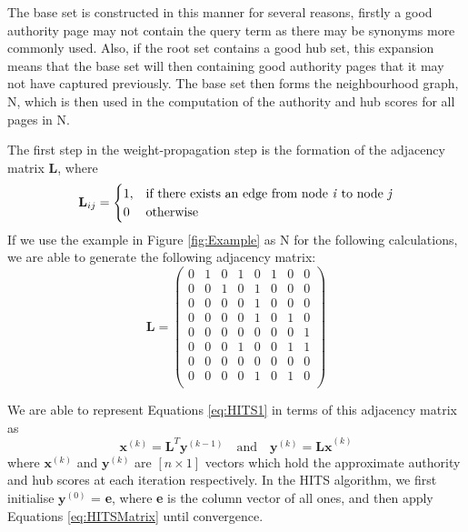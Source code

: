 \documentclass[11pt]{report}
\begin{document}
The base set is constructed in this manner for several reasons, firstly a good authority page may not contain the query term  as there may be synonyms more commonly used. Also, if the root set contains a good hub set, this expansion means that the base set will then containing good authority pages that it may not have captured previously. The base set then forms the neighbourhood graph, N, which is then used in the computation of the authority and hub scores for all pages in N.


The first step in the weight-propagation step is the formation of the adjacency matrix \textbf{L}, where \[\textbf{L}_{ij} = \begin{cases} 1, & \textnormal{if there exists an edge from node \textit{i} to node \textit{j}}\\ 0 & \textnormal{otherwise}
\end{cases}\]
If we use the example in Figure \ref{fig:Example} as N for the following calculations, we are able to generate the following adjacency matrix:
\begin{equation*}
\textbf{L}=\left(
\begin{array}{cccccccc}
0 & 1 & 0 & 1 & 0 & 1 & 0 & 0 \\
0 & 0 & 1 & 0 & 1 & 0 & 0 & 0 \\
0 & 0 & 0 & 0 & 1 & 0 & 0 & 0 \\
0 & 0 & 0 & 0 & 1 & 0 & 1 & 0 \\
0 & 0 & 0 & 0 & 0 & 0 & 0 & 1 \\
0 & 0 & 0 & 1 & 0 & 0 & 1 & 1 \\
0 & 0 & 0 & 0 & 0 & 0 & 0 & 0 \\
0 & 0 & 0 & 0 & 1 & 0 & 1 & 0 \\
\end{array}
\right)
\end{equation*} 

We are able to represent Equations \eqref{eq:HITS1} in terms of this adjacency matrix as \begin{equation} \label{eq:HITSMatrix}
\textbf{x}^{(k)} = \textbf{L}^T\textbf{y}^{(k-1)}\quad\mathrm{and}\quad \textbf{y}^{(k)}=\textbf{Lx}^{(k)}
\end{equation} where \(\textbf{x}^{(k)}\) and \(\textbf{y}^{(k)}\) are $[\textit{n}\times 1]$ vectors which hold the approximate authority and hub scores at each iteration respectively. In the HITS algorithm, we first initialise $\textbf{y}^{(0)}$ = \textbf{e}, where \textbf{e} is the column vector of all ones, and then apply Equations \eqref{eq:HITSMatrix} until convergence. 
\end{document}
